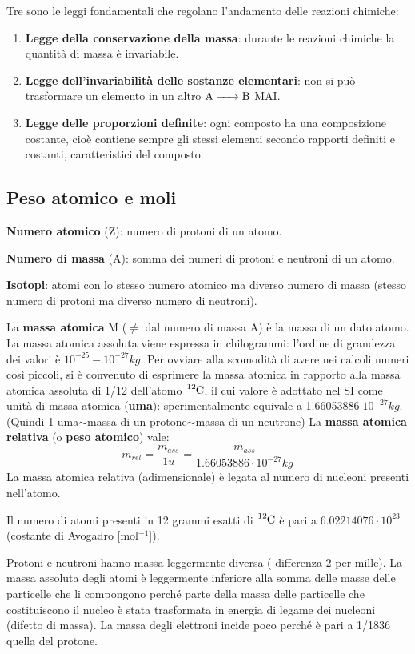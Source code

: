 Tre sono le leggi fondamentali che regolano l'andamento delle reazioni chimiche:

\begin{enumerate}
    \item \textbf{Legge della conservazione della massa}: durante le reazioni chimiche la quantità di massa è invariabile.
    \item \textbf{Legge dell'invariabilità delle sostanze elementari}: non si può trasformare un elemento in un altro \(\ce{ A -> B }\) MAI.
    \item \textbf{Legge delle proporzioni definite}: ogni composto ha una composizione costante, cioè contiene sempre gli stessi elementi secondo rapporti definiti e costanti, caratteristici del composto.
\end{enumerate}

\subsection{Peso atomico e moli}
\textbf{Numero atomico} (Z): numero di protoni di un atomo.

\textbf{Numero di massa} (A): somma dei numeri di protoni e neutroni di un
atomo.

\textbf{Isotopi}: atomi con lo stesso numero atomico ma diverso numero di
massa (stesso numero di protoni ma diverso numero di neutroni).

La \textbf{massa atomica} M ($\neq$ dal numero di massa A) è la massa di un dato atomo. La massa atomica assoluta viene espressa in chilogrammi: l'ordine di grandezza dei valori è $10^{-25}-10^{-27} kg$. Per ovviare alla scomodità di avere nei calcoli numeri così piccoli, si è convenuto di esprimere la
massa atomica in rapporto alla massa atomica assoluta di 1/12 dell'atomo \(\ce{ ^{12}C }\), il cui valore è adottato nel SI come unità di massa atomica (\textbf{uma}): sperimentalmente equivale a 1.66053886$\cdot
10^{-27} kg$. (Quindi 1 uma$\sim$massa di un protone$\sim$massa di un neutrone)
La \textbf{massa atomica relativa} (o \textbf{peso atomico}) vale:
$$m_{rel}=\frac{m_{ass}}{1 u}=\frac{m_{ass}}{1.66053886\cdot
10^{-27} kg}$$
La massa atomica relativa (adimensionale) è legata al numero di nucleoni presenti nell'atomo.

Il numero di atomi presenti in 12 grammi esatti di \(\ce{ ^{12}C }\) è pari a $6.02214076\cdot10^{23}$ (costante di Avogadro [mol$^{-1}$]).

Protoni e neutroni hanno massa leggermente diversa ( differenza 2 per mille). La massa assoluta degli atomi è leggermente inferiore alla somma delle masse delle particelle che li compongono perché parte della massa delle particelle che costituiscono il nucleo è stata trasformata in energia di legame dei nucleoni (difetto di massa).
La massa degli elettroni incide poco perché è pari a 1/1836 quella del protone.

